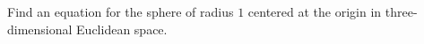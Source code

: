 Find an equation for the sphere of radius $1$ centered at the origin in three-dimensional Euclidean space.
